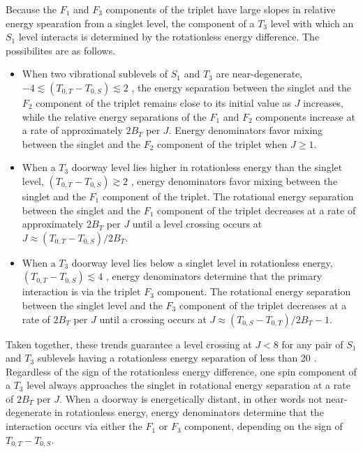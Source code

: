 \documentclass[12pt]{mitthesis}
\begin{document}
Because the $F_1$ and $F_3$ components of the triplet have large
slopes in relative energy spearation from a singlet level, the
component of a $T_3$ level with which an $S_1$ level interacts is
determined by the rotationless energy difference.  The possibilites
are as follows.
\begin{itemize}
\item When two vibrational sublevels of $S_1$ and $T_3$ are
  near-degenerate, $-4 \lesssim (T_{0,T} - T_{0,S}) \lesssim 2$ \rcm,
  the energy separation between the singlet and the $F_2$ component of
  the triplet remains close to its initial value as $J$ increases,
  while the relative energy separations of the $F_1$ and $F_2$
  components increase at a rate of approximately $2B_T$ per $J$.
  Energy denominators favor mixing between the singlet and the $F_2$
  component of the triplet when $J \ge 1$.
\item When a $T_3$ doorway level lies higher in rotationless energy
  than the singlet level, $ (T_{0,T} - T_{0,S}) \gtrsim 2$ \rcm,
  energy denominators favor mixing between the singlet and the $F_1$
  component of the triplet.  The rotational energy separation between
  the singlet and the $F_1$ component of the triplet decreases at a
  rate of approximately $2B_T$ per $J$ until a level crossing occurs
  at $J \approx (T_{0,T} - T_{0,S}) / 2 B_T$.
\item When a $T_3$ doorway level lies below a singlet level in
  rotationless energy, $(T_{0,T} - T_{0,S}) \lesssim 4$ \rcm, energy
  denominators determine that the primary interaction is via the
  triplet $F_3$ component.  The rotational energy separation between
  the singlet level and the $F_3$ component of the triplet decreases
  at a rate of $2B_T$ per $J$ until a crossing occurs at $J \approx
  (T_{0,S} - T_{0,T}) / 2 B_T - 1$.
\end{itemize}
Taken together, these trends guarantee a level crossing at $J<8$ for
any pair of $S_1$ and $T_3$ sublevels having a rotationless energy
separation of less than 20 \rcm.  Regardless of the sign of the
rotationless energy difference, one spin component of a $T_3$ level
always approaches the singlet in rotational energy separation at a
rate of $2B_T$ per $J$.  When a doorway is energetically distant, in
other words not near-degenerate in rotationless energy, energy
denominators determine that the interaction occurs via either the
$F_1$ or $F_3$ component, depending on the sign of $T_{0,T} - T_{0,S}$.
\end{document}
